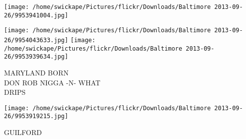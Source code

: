 \documentclass[10pt,letterpaper]{article}
\begin{document}
\texttt{[image: /home/swickape/Pictures/flickr/Downloads/Baltimore 2013-09-26/9953941004.jpg]}

\vspace{0.25in}
\texttt{[image: /home/swickape/Pictures/flickr/Downloads/Baltimore 2013-09-26/9954043633.jpg]}
\texttt{[image: /home/swickape/Pictures/flickr/Downloads/Baltimore 2013-09-26/9953939634.jpg]}

MARYLAND BORN\\
DON ROB NIGGA {-}N{-} WHAT\\
DRIPS
\pagebreak

\texttt{[image: /home/swickape/Pictures/flickr/Downloads/Baltimore 2013-09-26/9953919215.jpg]}

GUILFORD
\pagebreak
\end{document}
